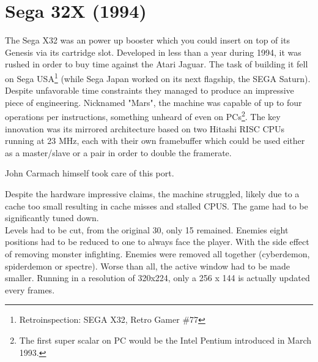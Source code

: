 \section{Sega 32X (1994)}
The Sega X32 was an power up booster which you could insert on top of its Genesis via its cartridge slot. Developed in less than a year during 1994, it was rushed in order to buy time against the Atari Jaguar. The task of building it fell on Sega USA\footnote{Retroinspection: SEGA X32, Retro Gamer \#77} (while Sega Japan worked on its next flagship, the SEGA Saturn). Despite unfavorable time constraints they managed to produce an impressive piece of engineering. Nicknamed "Mars", the machine was capable of up to four operations per instructions, something unheard of even on PCs\footnote{The first super scalar on PC would be the Intel Pentium introduced in March 1993.}. The key innovation was its mirrored architecture based on two Hitashi RISC CPUs running at 23 MHz, each with their own framebuffer which could be used either as a master/slave or a pair in order to double the framerate.\\
\par
{}
\par
{}
\par
John Carmach himself took care of this port.\\
\par
{}
\par
Despite the hardware impressive claims, the machine struggled, likely due to a cache too small resulting in cache misses and stalled CPUS. The game had to be significantly tuned down.\\ Levels had to be cut, from the original 30, only 15 remained. Enemies eight positions had to be reduced to one to always face the player. With the side effect of removing monster infighting. Enemies were removed all together (cyberdemon, spiderdemon or spectre). Worse than all, the active window had to be made smaller. Running in a resolution of 320x224, only a 256 x 144 is actually updated every frames.\\
